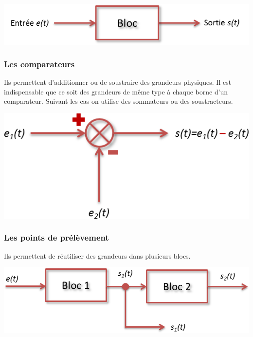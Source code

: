 \documentclass[10pt,fleqn]{article} %
\begin{document}
\begin{center}
    \includegraphics[width=.7\textwidth]{images/bloc}
\end{center}

\subsubsection*{Les comparateurs}
\begin{minipage}[c]{.55\linewidth}
Ils permettent d'additionner ou de soustraire des grandeurs physiques. Il est indispensable que ce soit des grandeurs de même type à chaque borne d'un comparateur. Suivant les cas on utilise des sommateurs ou des soustracteurs.
\end{minipage}\hfill
\begin{minipage}[c]{.4\linewidth}
\begin{center}
    \includegraphics[width=\textwidth]{images/comp}
\end{center}
\end{minipage}

\subsubsection*{Les points de prélèvement}

\begin{minipage}[c]{.55\linewidth}
Ils permettent de réutiliser des grandeurs dans plusieurs blocs.
\end{minipage}\hfill
\begin{minipage}[c]{.4\linewidth}
\begin{center}
    \includegraphics[width=\textwidth]{images/prel}
\end{center}
\end{minipage}
\end{document}
